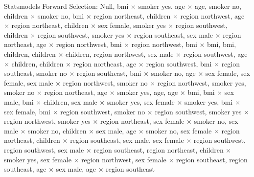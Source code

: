 \documentclass{article}
\begin{document}
Statsmodels Forward Selection: Null, bmi $\times$ smoker yes, age $\times$ age, smoker no, children $\times$ smoker no, bmi $\times$ region northeast, children $\times$ region northwest, age $\times$ region northeast, children $\times$ sex female, smoker yes $\times$ region southwest, children $\times$ region southwest, smoker yes $\times$ region southeast, sex male $\times$ region northeast, age $\times$ region northwest, bmi $\times$ region northwest, bmi $\times$ bmi, bmi, children, children $\times$ children, region northwest, sex male $\times$ region southwest, age $\times$ children, children $\times$ region northeast, age $\times$ region southwest, bmi $\times$ region southeast, smoker no $\times$ region southeast, bmi $\times$ smoker no, age $\times$ sex female, sex female, sex male $\times$ region northwest, smoker no $\times$ region northwest, smoker yes, smoker no $\times$ region northeast, age $\times$ smoker yes, age, age $\times$ bmi, bmi $\times$ sex male, bmi $\times$ children, sex male $\times$ smoker yes, sex female $\times$ smoker yes, bmi $\times$ sex female, bmi $\times$ region southwest, smoker no $\times$ region southwest, smoker yes $\times$ region northwest, smoker yes $\times$ region northeast, sex female $\times$ smoker no, sex male $\times$ smoker no, children $\times$ sex male, age $\times$ smoker no, sex female $\times$ region northeast, children $\times$ region southeast, sex male, sex female $\times$ region southwest, region southwest, sex male $\times$ region southeast, region northeast, children $\times$ smoker yes, sex female $\times$ region northwest, sex female $\times$ region southeast, region southeast, age $\times$ sex male, age $\times$ region southeast
\end{document}
